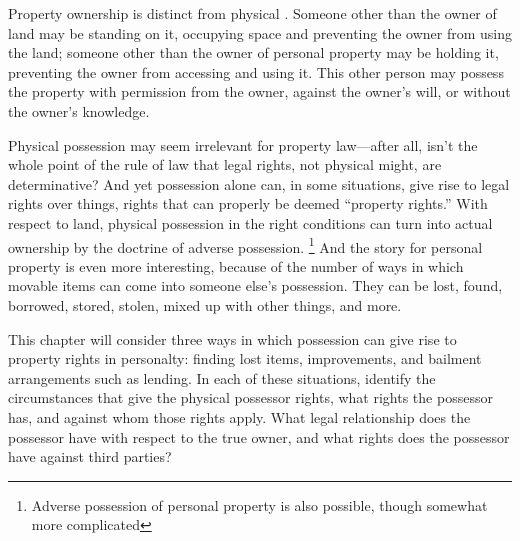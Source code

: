 Property ownership is distinct from physical . Someone other
than the owner of land may be standing on it, occupying space and preventing
the owner from using the land; someone other than the owner of personal property
may be holding it, preventing the owner from accessing and using it. This other
person may possess the property with permission from the owner, against the
owner's will, or without the owner's knowledge.

Physical possession may seem irrelevant for property law---after all, isn't the
whole point of the rule of law that legal rights, not physical might, are
determinative? And yet possession alone can, in some situations, give rise to
legal rights over things, rights that can properly be deemed ``property
rights.'' With respect to land, physical possession in the right conditions can
turn into actual ownership by the doctrine of adverse possession.
\unskip\footnote{Adverse possession of personal property is also possible,
though somewhat more complicated}
And the story
for personal property is even more interesting, because of the number of ways in
which movable items can come into someone else's possession. They can be lost,
found, borrowed, stored, stolen, mixed up with other things, and more.

This chapter will consider three ways in which possession can give rise to
property rights in personalty: finding lost items, improvements, and bailment
arrangements such as lending. In each of these situations, identify the
circumstances that give the physical possessor rights, what rights the possessor
has, and against whom those rights apply. What legal relationship does the
possessor have with respect to the true owner, and what rights does the
possessor have against third parties?

